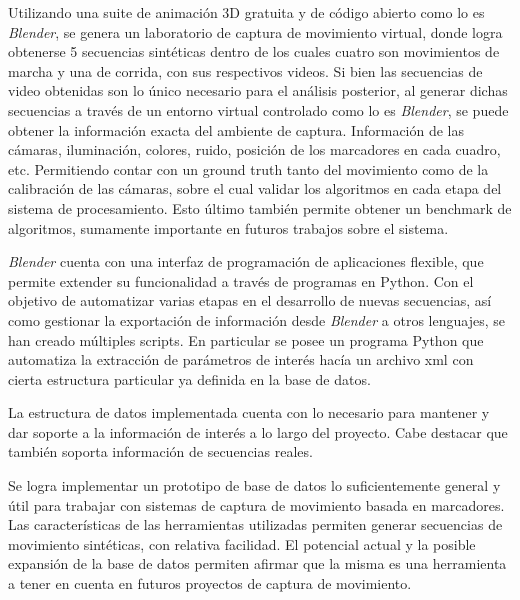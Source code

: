  Utilizando una suite de animación 3D gratuita y de código abierto como lo es \textit{Blender}, se genera un laboratorio de captura de movimiento virtual, donde logra obtenerse 5 secuencias sintéticas dentro de los cuales cuatro son movimientos de marcha y una de corrida, con sus respectivos videos.  Si bien las secuencias de video obtenidas son lo único necesario para el análisis posterior, al generar dichas secuencias a través de un entorno virtual controlado como lo es \textit{Blender}, se puede obtener la información exacta del ambiente de captura. Información de las cámaras, iluminación, colores, ruido, posición de los marcadores en cada cuadro, etc. Permitiendo contar con un ground truth tanto del movimiento como de la calibración de las cámaras, sobre el cual validar los algoritmos en cada etapa del sistema de procesamiento. Esto último también permite obtener un benchmark de algoritmos, sumamente importante en futuros trabajos sobre el sistema. 
 
   
\textit{Blender} cuenta con una interfaz de programación de aplicaciones flexible, que permite extender su funcionalidad a través de programas en Python. Con el objetivo de automatizar varias etapas en el desarrollo de nuevas secuencias, así como gestionar la exportación de información desde \textit{Blender} a otros lenguajes, se han creado múltiples scripts. En particular se posee un programa Python que automatiza la extracción de parámetros de interés hacía un archivo xml con cierta estructura particular ya definida en la base de datos. 


La estructura de datos implementada cuenta con lo necesario para mantener y dar soporte a la información de interés a lo largo del proyecto. Cabe destacar que también soporta información de secuencias reales.



Se logra implementar un prototipo de base de datos lo suficientemente general y útil para trabajar con sistemas de captura de movimiento basada en marcadores. Las características de las herramientas utilizadas permiten generar secuencias de movimiento sintéticas, con relativa facilidad. El potencial actual y la posible expansión de la base de datos permiten afirmar que la misma es una herramienta a tener en cuenta en futuros proyectos de captura de movimiento.

